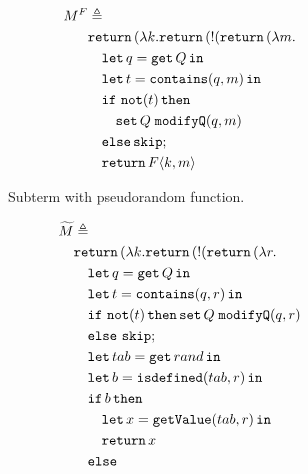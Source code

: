\begin{figure}[htpb]
\small{
    \centering
    \begin{subfigure}[c]{0.45\textwidth}
        \begin{align*}
        \begin{aligned}
            M^F &\triangleq \\
            &\mathtt{return}\,(\lambda k.\mathtt{return}\,(\mathord{!}(\mathtt{return}\,(\lambda m.\\
            &\quad \mathtt{let}\,q=\mathtt{get}\, Q\,\mathtt{in}\, \\
            &\quad \mathtt{let}\,t=\mathtt{contains}(q,m)\,\mathtt{in}\, \\
            &\quad \mathtt{if}\ \mathtt{not}(t)\,\mathtt{then} \\ 
            &\qquad \mathtt{set}\,Q\;\mathtt{modifyQ}(q,m) \\
            &\quad \mathtt{else}\, \mathtt{skip}; \\
            &\quad \mathtt{return}\, F\langle k,m \rangle
        \end{aligned}
        \end{align*}
        \caption{Subterm with pseudorandom function.}
        \label{subfig:oracle-pseudo-random}
    \end{subfigure}
    \hfill
    \begin{subfigure}[c]{0.45\textwidth}
        \begin{align*}
        \begin{aligned}
            \widetilde{M} &\triangleq \\
            &\return(\lambda k.\return(\bang(\return(\lambda r. \\
            &\quad \letin{q=\get Q}{} \\
            &\quad \letin{t=\mathtt{contains}(q, r)}{} \\
            &\quad \mathtt{if}\ \mathtt{not}(t)\,\mathtt{then} \,\mathtt{set}\,Q\;\mathtt{modifyQ}(q, r) \\
            &\quad \mathtt{else}\ \mathtt{skip}; \\
            &\quad \letin{tab=\mathtt{get}\,rand}{} \\
            &\quad \letin{b=\mathtt{isdefined}(tab, r)}{} \\
            &\quad \mathtt{if}\,b\,\mathtt{then} \\
            &\quad\quad \letin{x=\mathtt{getValue}(tab, r)}{} \\
            &\quad\quad \return x \\
            &\quad \mathtt{else} \\

\end{aligned}
\end{align*}
\end{subfigure}}
\end{figure}
